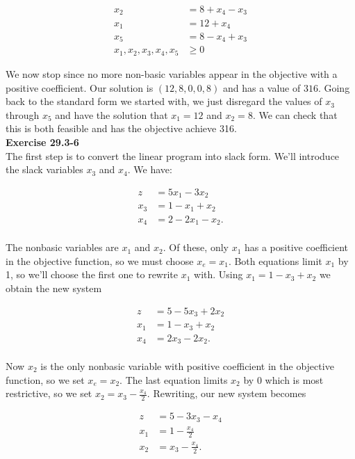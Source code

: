 \documentclass{article}
\begin{document}
\begin{align*}
x_2 & = 8+ x_4 - x_3\\
x_1 & = 12 + x_4 \\
x_5 & = 8 - x_4 + x_3\\
x_1,x_2,x_3,x_4,x_5 &\ge 0
\end{align*}

We now stop since no more non-basic variables appear in the objective with a positive coefficient. Our solution is $(12,8,0,0,8)$ and has a value of $316$. Going back to the standard form we started with, we just disregard the values of $x_3$ through $x_5$ and have the solution that $x_1 = 12$ and $x_2 = 8$. We can check that this is both feasible and has the objective achieve 316.\\

\noindent\textbf{Exercise 29.3-6}\\

The first step is to convert the linear program into slack form.  We'll introduce the slack variables $x_3$ and $x_4$.  We have:

\begin{align*}
z &= 5x_1 - 3x_2\\
x_3 &= 1 - x_1 + x_2 \\
x_4 &= 2 - 2x_1 - x_2. \\
\end{align*}

The nonbasic variables are $x_1$ and $x_2$.  Of these, only $x_1$ has a positive coefficient in the objective function, so we must choose $x_e = x_1$. Both equations limit $x_1$ by 1, so we'll choose the first one to rewrite $x_1$ with. Using $x_1 = 1 - x_3+ x_2$ we obtain the new system

\begin{align*}
z &= 5 - 5x_3 + 2x_2\\
x_1 &= 1 - x_3+ x_2 \\
x_4 &= 2x_3 - 2x_2. \\
\end{align*}

Now $x_2$ is the only nonbasic variable with positive coefficient in the objective function, so we set $x_e = x_2$.  The last equation limits $x_2$ by 0 which is most restrictive, so we set $x_2 = x_3 - \frac{x_4}{2}$.  Rewriting, our new system becomes

\begin{align*}
z &= 5 - 3x_3 - x_4\\
x_1 &= 1 - \frac{x_4}{2} \\
x_2 &= x_3 - \frac{x_4}{2} . \\
\end{align*}
\end{document}
